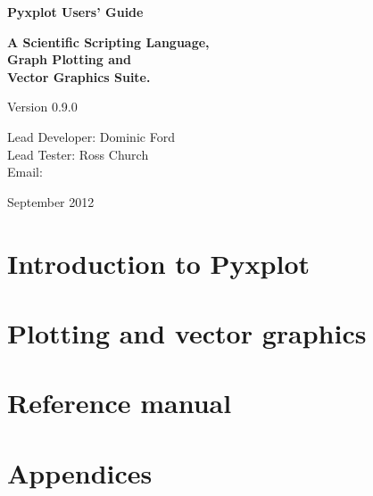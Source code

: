 \documentclass[a4paper,onecolumn,11pt]{book}
\def\version{0.9.0}
\def\reldate{September 2012}
\begin{document}
\begin{titlepage}
\normalsize
\begin{center}
{\Huge \bf Pyxplot Users' Guide}\\
\end{center}
\newline
\begin{center}
{\LARGE \bf A Scientific Scripting Language, \\ Graph Plotting and \\ Vector Graphics Suite. \\}
\end{center}
\newline
\begin{center}
{\Large Version \version \\}
\end{center}
\newline
\begin{center}
{\large
Lead Developer: Dominic Ford \\
\vspace{1mm}
Lead Tester: Ross Church \\
\vspace{2mm}
Email:  \\
}
\end{center}
\newline
\begin{center}
{\Large \reldate \\}
\end{center}
\end{titlepage}

\part{Introduction to Pyxplot}







\part{Plotting and vector graphics}



\part{Reference manual}









\part{Appendices}
\appendix





\printindex
\end{document}
